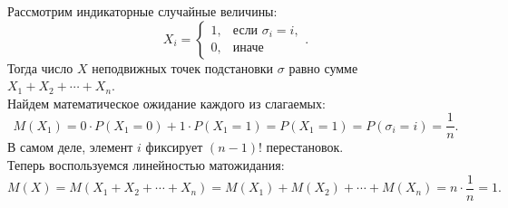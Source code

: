 \documentclass{article}
\begin{document}
Рассмотрим индикаторные случайные величины:
$$X_i = \begin{cases} 1,& \text{если } \sigma_i = i,\\0,& \text{иначе} \end{cases}.$$
Тогда число $X$ неподвижных точек подстановки $\sigma$ равно сумме $X_1 + X_2 + \cdots + X_n$.\\
Найдем математическое ожидание каждого из слагаемых:
$$M(X_1) = 0 \cdot P(X_1=0) + 1 \cdot P(X_1=1) = P(X_1=1)=P(\sigma_i=i)=\frac{1}{n}.$$
В самом деле, элемент $i$ фиксирует $(n-1)!$ перестановок.\\
Теперь воспользуемся линейностью матожидания:
$$M(X) = M(X_1 + X_2 + \cdots + X_n) = M(X_1) + M(X_2) + \cdots + M(X_n) = n \cdot \frac{1}{n} = 1.$$
\end{document}
